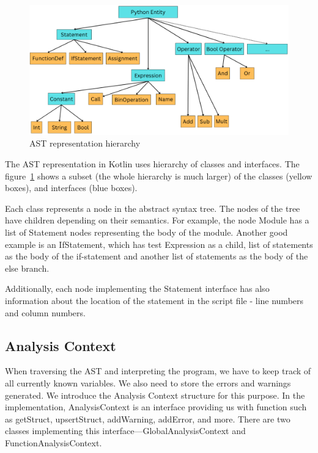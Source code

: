\begin{figure}[H]
    \caption{AST representation hierarchy}
    \label{fig:python_hierarchy}
    \centering
    \includegraphics[scale=0.5]{img/python_hierarchy}
\end{figure}


The AST representation in Kotlin uses hierarchy of classes and interfaces.
The figure~\ref{fig:python_hierarchy} shows a subset (the whole hierarchy is much larger) of the classes (yellow boxes),
and interfaces (blue boxes).

Each class represents a node in the abstract syntax tree.
The nodes of the tree have children depending on their semantics.
For example, the node Module has a list of Statement nodes representing the body of the module.
Another good example is an IfStatement, which has test Expression as a child, list of statements as the body of the
if-statement and another list of statements as the body of the else branch.

Additionally, each node implementing the Statement interface has also information about the location of the statement
in the script file - line numbers and column numbers.

\subsection{Analysis Context}\label{subsec:analysis-context}

When traversing the AST and interpreting the program, we have to keep track of all currently known variables.
We also need to store the errors and warnings generated.
We introduce the Analysis Context structure for this purpose.
In the implementation, AnalysisContext is an interface providing us with function such as getStruct, upsertStruct,
addWarning, addError, and more.
There are two classes implementing this interface---GlobalAnalysisContext and FunctionAnalysisContext.

